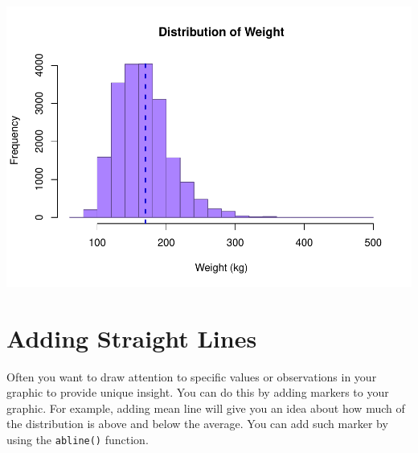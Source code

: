 \documentclass[
]{book}
\newenvironment{Shaded}{\begin{snugshade}}{\end{snugshade}}
\newcommand{\CommentTok}[1]{\textcolor[rgb]{0.56,0.35,0.01}{\textit{#1}}}
\newcommand{\DataTypeTok}[1]{\textcolor[rgb]{0.13,0.29,0.53}{#1}}
\newcommand{\DecValTok}[1]{\textcolor[rgb]{0.00,0.00,0.81}{#1}}
\newcommand{\KeywordTok}[1]{\textcolor[rgb]{0.13,0.29,0.53}{\textbf{#1}}}
\newcommand{\NormalTok}[1]{#1}
\newcommand{\OperatorTok}[1]{\textcolor[rgb]{0.81,0.36,0.00}{\textbf{#1}}}
\newcommand{\StringTok}[1]{\textcolor[rgb]{0.31,0.60,0.02}{#1}}
\begin{document}
\includegraphics{_main_files/figure-latex/unnamed-chunk-183-1.pdf}

\hypertarget{adding-straight-lines}{%
\section{Adding Straight Lines}\label{adding-straight-lines}}

Often you want to draw attention to specific values or observations in your graphic to provide unique insight. You can do this by adding markers to your graphic. For example, adding mean line will give you an idea about how much of the distribution is above and below the average. You can add such marker by using the \texttt{abline()} function.

\begin{Shaded}
\end{Shaded}
\end{document}

